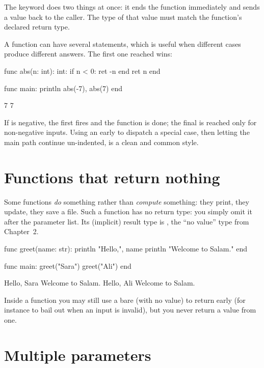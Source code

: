 The  keyword does two things at once: it ends the function immediately
and sends a value back to the caller. The type of that value must match the
function's declared return type.

A function can have several  statements, which is useful when different cases
produce different answers. The first one reached wins:

\begin{salamen}
func abs(n: int): int:
    if n < 0:
        ret -n
    end
    ret n
end

func main:
    println abs(-7), abs(7)
end
\end{salamen}

\begin{progout}
7 7
\end{progout}

If  is negative, the first  fires and the function is done; the
final  is reached only for non-negative inputs. Using an early
 to dispatch a special case, then letting the main path continue
un-indented, is a clean and common style.

\section{Functions that return nothing}

Some functions \emph{do} something rather than \emph{compute} something: they
print, they update, they save a file. Such a function has no return type: you
simply omit it after the parameter list. Its (implicit) result type is
, the ``no value'' type from Chapter~2.

\begin{salamen}
func greet(name: str):
    println "Hello,", name
    println "Welcome to Salam."
end

func main:
    greet("Sara")
    greet("Ali")
end
\end{salamen}

\begin{progout}
Hello, Sara
Welcome to Salam.
Hello, Ali
Welcome to Salam.
\end{progout}

Inside a  function you may still use a bare  (with no value)
to return early (for instance to bail out when an input is invalid), but you
never return a value from one.

\section{Multiple parameters}

